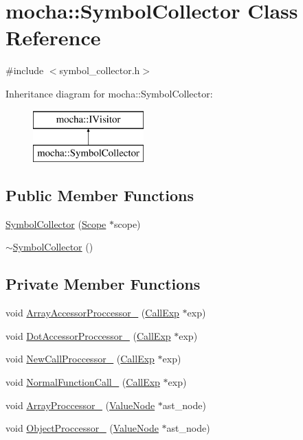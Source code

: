 \hypertarget{classmocha_1_1_symbol_collector}{
\section{mocha::SymbolCollector Class Reference}
\label{classmocha_1_1_symbol_collector}
}


{\ttfamily \#include $<$symbol\_\-collector.h$>$}

Inheritance diagram for mocha::SymbolCollector:\begin{figure}[H]
\begin{center}
\leavevmode
\includegraphics[height=2.000000cm]{classmocha_1_1_symbol_collector}
\end{center}
\end{figure}
\subsection*{Public Member Functions}
\begin{DoxyCompactItemize}
\item 
\hyperlink{classmocha_1_1_symbol_collector_a3c05cbf14f603b15f37b17f4f92e2f89}{SymbolCollector} (\hyperlink{classmocha_1_1_scope}{Scope} $\ast$scope)
\item 
\hyperlink{classmocha_1_1_symbol_collector_aa807e9d74986b8653c4c88928a8c9ee7}{$\sim$SymbolCollector} ()
\end{DoxyCompactItemize}
\subsection*{Private Member Functions}
\begin{DoxyCompactItemize}
\item 
void \hyperlink{classmocha_1_1_symbol_collector_acd4d906a777056fa4b48708d1cdc932d}{ArrayAccessorProccessor\_\-} (\hyperlink{classmocha_1_1_call_exp}{CallExp} $\ast$exp)
\item 
void \hyperlink{classmocha_1_1_symbol_collector_a854c329205e0054c0a8d9258596078b1}{DotAccessorProccessor\_\-} (\hyperlink{classmocha_1_1_call_exp}{CallExp} $\ast$exp)
\item 
void \hyperlink{classmocha_1_1_symbol_collector_ab63553cc490017d445e263ed2a624639}{NewCallProccessor\_\-} (\hyperlink{classmocha_1_1_call_exp}{CallExp} $\ast$exp)
\item 
void \hyperlink{classmocha_1_1_symbol_collector_aa0314c549055474fcb3b2fc776209fc9}{NormalFunctionCall\_\-} (\hyperlink{classmocha_1_1_call_exp}{CallExp} $\ast$exp)
\item 
void \hyperlink{classmocha_1_1_symbol_collector_a344417e6fbcd90934a9187818d48796e}{ArrayProccessor\_\-} (\hyperlink{classmocha_1_1_value_node}{ValueNode} $\ast$ast\_\-node)
\item 
void \hyperlink{classmocha_1_1_symbol_collector_a6e47eac35f604c74de86a222ddcd45e4}{ObjectProccessor\_\-} (\hyperlink{classmocha_1_1_value_node}{ValueNode} $\ast$ast\_\-node)
\end{DoxyCompactItemize}
